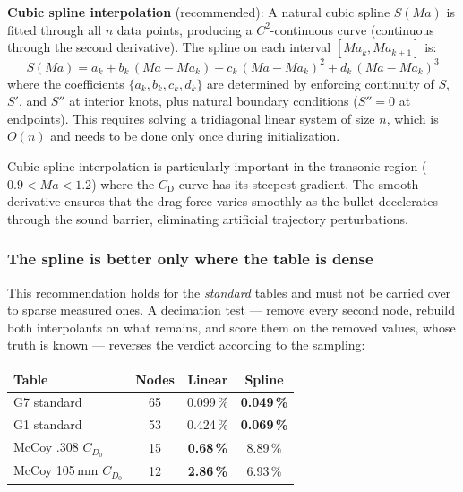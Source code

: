\documentclass[11pt,twoside,openright]{report}
\newcommand{\Cd}{C_{\mathrm{D}}}
\newcommand{\Mach}{\mathit{Ma}}
\begin{document}
\textbf{Cubic spline interpolation} (recommended): A natural cubic spline $S(\Mach)$ is fitted through all $n$ data points, producing a $C^2$-continuous curve (continuous through the second derivative). The spline on each interval $[\Mach_k, \Mach_{k+1}]$ is:
\begin{equation}
  S(\Mach) = a_k + b_k\,(\Mach - \Mach_k) + c_k\,(\Mach - \Mach_k)^2 + d_k\,(\Mach - \Mach_k)^3
  \label{eq:cubic_spline}
\end{equation}
where the coefficients $\{a_k, b_k, c_k, d_k\}$ are determined by enforcing continuity of $S$, $S'$, and $S''$ at interior knots, plus natural boundary conditions ($S'' = 0$ at endpoints). This requires solving a tridiagonal linear system of size $n$, which is $O(n)$ and needs to be done only once during initialization.

Cubic spline interpolation is particularly important in the transonic region ($0.9 < \Mach < 1.2$) where the $\Cd$ curve has its steepest gradient. The smooth derivative ensures that the drag force varies smoothly as the bullet decelerates through the sound barrier, eliminating artificial trajectory perturbations.

\subsubsection*{The spline is better only where the table is dense}

This recommendation holds for the \emph{standard} tables and must not be carried over
to sparse measured ones. A decimation test --- remove every second node, rebuild both
interpolants on what remains, and score them on the removed values, whose truth is
known --- reverses the verdict according to the sampling:

\begin{center}
\begin{tabular}{lccc}
\toprule
Table & Nodes & Linear & Spline \\
\midrule
G7 standard      & 65 & 0.099\,\% & \textbf{0.049\,\%} \\
G1 standard      & 53 & 0.424\,\% & \textbf{0.069\,\%} \\
McCoy .308 $C_{D_0}$ & 15 & \textbf{0.68\,\%} & 8.89\,\% \\
McCoy 105\,mm $C_{D_0}$ & 12 & \textbf{2.86\,\%} & 6.93\,\% \\
\bottomrule
\end{tabular}
\end{center}
\end{document}
